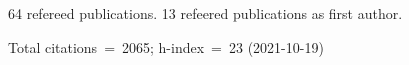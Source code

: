 64 refereed publications. 13 refeered publications as first author.

Total citations~=~2065; h-index~=~23 (2021-10-19)